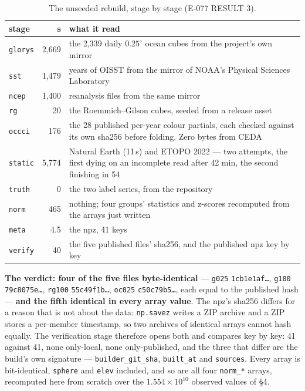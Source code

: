 \documentclass[10pt]{article}
\newcommand{\code}[1]{\texttt{#1}}
\begin{document}
\begin{table}[h]
\centering\setlength{\tabcolsep}{5pt}\footnotesize
\begin{tabular}{@{}lr>{\raggedright\arraybackslash}p{9.8cm}@{}}
\toprule
stage & s & what it read \\
\midrule
\code{glorys} & 2,669 & the 2,339 daily $0.25^\circ$ ocean cubes from the project's own mirror \\
\code{sst} & 1,479 & 43 years of OISST from the mirror of NOAA's Physical Sciences Laboratory \\
\code{ncep} & 1,400 & 645 reanalysis files from the same mirror \\
\code{rg} & 20 & the Roemmich--Gilson cubes, seeded from a release asset \\
\code{occci} & 176 & the 28 published per-year colour partials, each checked against its own sha256 before folding. Zero bytes from CEDA \\
\code{static} & 5,774 & Natural Earth (11\,s) and ETOPO 2022 --- two attempts, the first dying on an incomplete read after 42 min, the second finishing in 54 \\
\code{truth} & 0 & the two label series, from the repository \\
\code{norm} & 465 & nothing; four groups' statistics and z-scores recomputed from the arrays just written \\
\code{meta} & 4.5 & the npz, 41 keys \\
\code{verify} & 40 & the five published files' sha256, and the published npz key by key \\
\bottomrule
\end{tabular}
\caption{The unseeded rebuild, stage by stage (E-077 RESULT 3).}
\end{table}

\textbf{The verdict: four of the five files byte-identical} ---
\code{g025} \code{1cb1e1af\dots}, \code{g100} \code{79c8075e\dots},
\code{rg100} \code{55c49f1b\dots}, \code{oc025} \code{c50c79b5\dots}, each
equal to the published hash --- \textbf{and the fifth identical in every array
value}. The npz's sha256 differs for a reason that is not about the data:
\code{np.savez} writes a ZIP archive and a ZIP stores a per-member timestamp,
so two archives of identical arrays cannot hash equally. The verification
stage therefore opens both and compares key by key: 41 against 41, none
only-local, none only-published, and the three that differ are the build's own
signature --- \code{builder\_git\_sha}, \code{built\_at} and \code{sources}.
Every array is bit-identical, \code{sphere} and \code{elev} included, and so
are all four \code{norm\_*} arrays, recomputed here from scratch over the
$1.554\times10^{10}$ observed values of \S4.
\end{document}

